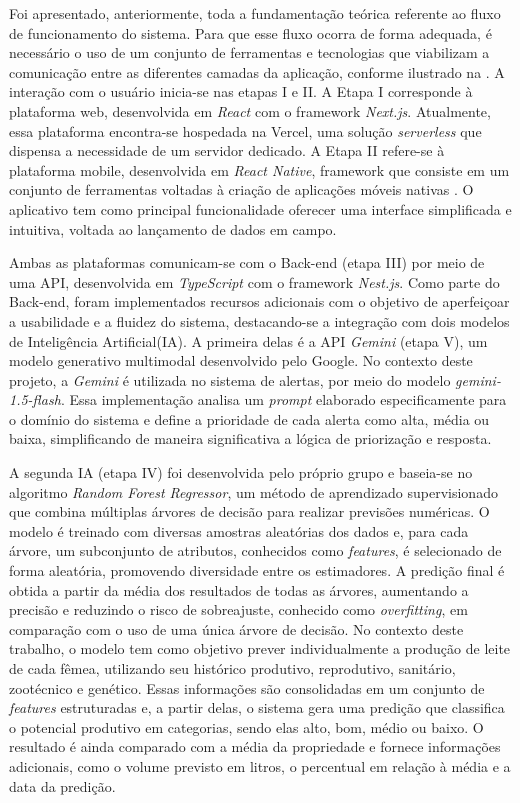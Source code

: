 Foi apresentado, anteriormente, toda a fundamentação teórica referente ao fluxo de funcionamento do sistema. Para que esse fluxo ocorra de forma adequada, é necessário o uso de um conjunto de ferramentas e tecnologias que viabilizam a comunicação entre as diferentes camadas da aplicação, conforme ilustrado na . A interação com o usuário inicia-se nas etapas I e II. A Etapa I corresponde à plataforma web, desenvolvida em \textit{React} com o framework \textit{Next.js}. Atualmente, essa plataforma encontra-se hospedada na Vercel, uma solução \textit{serverless} que dispensa a necessidade de um servidor dedicado. A Etapa II refere-se à plataforma mobile, desenvolvida em \textit{React Native}, framework que consiste em um conjunto de ferramentas voltadas à criação de aplicações móveis nativas \cite{Bruna2021}. O aplicativo tem como principal funcionalidade oferecer uma interface simplificada e intuitiva, voltada ao lançamento de dados em campo.

Ambas as plataformas comunicam-se com o Back-end (etapa III) por meio de uma API, desenvolvida em \textit{TypeScript} com o framework \textit{Nest.js}. Como parte do Back-end, foram implementados recursos adicionais com o objetivo de aperfeiçoar a usabilidade e a fluidez do sistema, destacando-se a integração com dois modelos de Inteligência Artificial(IA). A primeira delas é a API \textit{Gemini} (etapa V), um modelo generativo multimodal desenvolvido pelo Google. No contexto deste projeto, a \textit{Gemini} é utilizada no sistema de alertas, por meio do modelo \textit{gemini-1.5-flash}. Essa implementação analisa um \textit{prompt} elaborado especificamente para o domínio do sistema e define a prioridade de cada alerta como alta, média ou baixa, simplificando de maneira significativa a lógica de priorização e resposta.

A segunda IA (etapa IV) foi desenvolvida pelo próprio grupo e baseia-se no algoritmo \textit{Random Forest Regressor}, um método de aprendizado supervisionado que combina múltiplas árvores de decisão para realizar previsões numéricas. O modelo é treinado com diversas amostras aleatórias dos dados e, para cada árvore, um subconjunto de atributos, conhecidos como \textit{features}, é selecionado de forma aleatória, promovendo diversidade entre os estimadores. A predição final é obtida a partir da média dos resultados de todas as árvores, aumentando a precisão e reduzindo o risco de sobreajuste, conhecido como \textit{overfitting}, em comparação com o uso de uma única árvore de decisão. No contexto deste trabalho, o modelo tem como objetivo prever individualmente a produção de leite de cada fêmea, utilizando seu histórico produtivo, reprodutivo, sanitário, zootécnico e genético. Essas informações são consolidadas em um conjunto de \textit{features} estruturadas e, a partir delas, o sistema gera uma predição que classifica o potencial produtivo em categorias, sendo elas alto, bom, médio ou baixo. O resultado é ainda comparado com a média da propriedade e fornece informações adicionais, como o volume previsto em litros, o percentual em relação à média e a data da predição.

